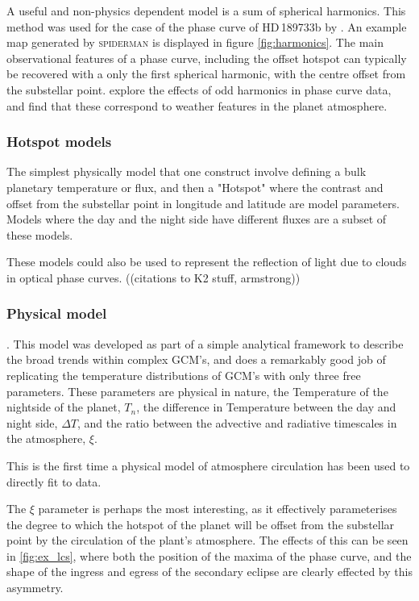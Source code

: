 \documentclass[a4paper,fleqn,usenatbib]{mnras}
\begin{document}
A useful and non-physics dependent model is a sum of spherical harmonics. This method was used for the case of the phase curve of HD\,189733b by \citet{Majeau2012}. An example map generated by \textsc{spiderman} is displayed in figure \ref{fig:harmonics}. The main observational features of a phase curve, including the offset hotspot can typically be recovered with a only the first spherical harmonic, with the centre offset from the substellar point. \citep{Cowan2016} explore the effects of odd harmonics in phase curve data, and find that these correspond to weather features in the planet atmosphere.

\subsubsection{Hotspot models}

The simplest physically model that one construct involve defining a bulk planetary temperature or flux, and then a "Hotspot" where the contrast and offset from the substellar point in longitude and latitude are model parameters. Models where the day and the night side have different fluxes are a subset of these models.

These models could also be used to represent the reflection of light due to clouds in optical phase curves. ((citations to K2 stuff, armstrong))

\subsubsection{Physical model}

\citet{Zhang2016}. This model was developed as part of a simple analytical framework to describe the broad trends within complex GCM's, and does a remarkably good job of replicating the temperature distributions of GCM's with only three free parameters. These parameters are physical in nature, the Temperature of the nightside of the planet, $T_n$, the difference in Temperature between the day and night side, $\Delta T$, and the ratio between the advective and radiative timescales in the atmosphere, $\xi$.

This is the first time a physical model of atmosphere circulation has been used to directly fit to data.

The $\xi$ parameter is perhaps the most interesting, as it effectively parameterises the degree to which the hotspot of the planet will be offset from the substellar point by the circulation of the plant's atmosphere. The effects of this can be seen in \ref{fig:ex_lcs}, where both the position of the maxima of the phase curve, and the shape of the ingress and egress of the secondary eclipse are clearly effected by this asymmetry.
\end{document}
